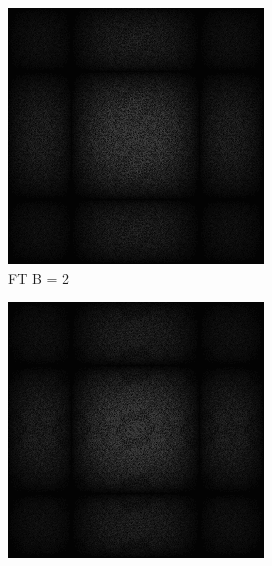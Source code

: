 \begin{figure}[H]


    \centering
    \begin{subfigure}[b]{0.2\linewidth}
      \includegraphics[width=\linewidth]{content/TemporalerAlg/Bilder/Sorting/DiffDimensions/2/seed_debug_5.0_small.png}
       \caption{FT B = 2}
       \label{pic:fftB_2}
    \end{subfigure}
    \begin{subfigure}[b]{0.2\linewidth}
      \includegraphics[width=\linewidth]{content/TemporalerAlg/Bilder/Sorting/DiffDimensions/3/seed_debug_5.0_small.png}

\end{subfigure}
\end{figure}
